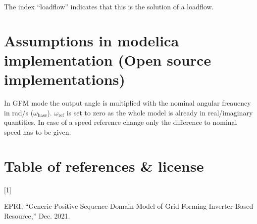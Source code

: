 \documentclass[
  a4paper,
  DIV=11,
  numbers=noendperiod]{scrartcl}
\newlength{\cslhangindent}
\newlength{\csllabelwidth}
\newenvironment{CSLReferences}[2] %
 {\begin{list}{}{%
  \setlength{\itemindent}{0pt}
  \setlength{\leftmargin}{0pt}
  \setlength{\parsep}{0pt}
  \ifodd #1
   \setlength{\leftmargin}{\cslhangindent}
   \setlength{\itemindent}{-1\cslhangindent}
  \fi
  \setlength{\itemsep}{#2\baselineskip}}}
 {\end{list}}
\newcommand{\CSLLeftMargin}[1]{\parbox[t]{\csllabelwidth}{\strut#1\strut}}
\newcommand{\CSLRightInline}[1]{\parbox[t]{\linewidth - \csllabelwidth}{\strut#1\strut}}
\begin{document}
The index ``loadflow'' indicates that this is the solution of a
loadflow.

\section{Assumptions in modelica implementation (Open source
implementations)}\label{assumptions-in-modelica-implementation-open-source-implementations}

In GFM mode the output angle is multiplied with the nominal angular
freauency in rad/s (\(\omega_\mathrm{base}\)). \(\omega_\mathrm{ref}\)
is set to zero as the whole model is already in real/imaginary
quantities. In case of a speed reference change only the difference to
nominal speed has to be given.

\section{Table of references \&
license}\label{table-of-references-license}

\label{refs}
\begin{CSLReferences}{0}{0}
\CSLLeftMargin{{[}1{]} }%
\CSLRightInline{EPRI, {``Generic {Positive Sequence Domain Model} of
{Grid Forming Inverter Based Resource},''} Dec. 2021.}

\end{CSLReferences}
\end{document}
